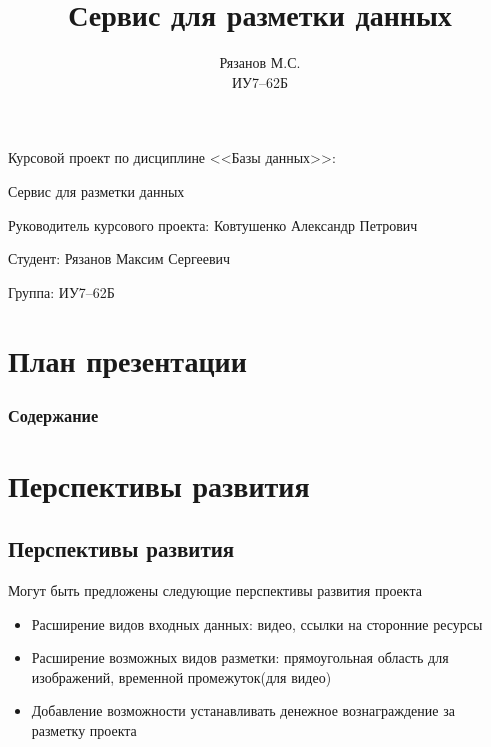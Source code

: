 \documentclass[fullscreen=true, bookmarks=false]{beamer}
\title{Сервис для разметки данных}
\author{Рязанов М.С.\\ИУ7--62Б}
\begin{document}
\begin{frame}
	Курсовой проект по дисциплине <<Базы данных>>:
    \begin{center}
    \Huge
    Сервис для разметки данных
    \end{center}

    \large
    Руководитель курсового проекта: Ковтушенко Александр Петрович

    Студент: Рязанов Максим Сергеевич

    Группа: ИУ7--62Б

\end{frame}

\section*{План презентации}

\begin{frame}
\frametitle{Содержание}
\tableofcontents
\end{frame}











\section*{Перспективы развития}
\subsection*{Перспективы развития}
\begin{frame}
    Могут быть предложены следующие перспективы развития проекта
    \begin{itemize}
        \item Расширение видов входных данных: видео, ссылки на сторонние ресурсы
        \item Расширение возможных видов разметки: прямоугольная область для изображений, временной промежуток(для видео)
        \item Добавление возможности устанавливать денежное вознаграждение за разметку проекта
    \end{itemize}
\end{frame}
\end{document}
